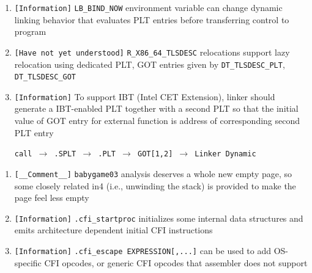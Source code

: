 \documentclass[main.tex]{subfiles}
\begin{document}
\newpage 

\begin{minipage}[t]{0.49\textwidth}
	\setlength{\parskip}{1em}
	\begin{enumerate}
		\item[\texttt{[\_]}] \texttt{[Information]} \texttt{LB\_BIND\_NOW} environment variable can change dynamic linking behavior that evaluates PLT entries before transferring control to program
		\item[\texttt{[\_]}] \texttt{[Have not yet understood]} \texttt{R\_X86\_64\_TLSDESC} relocations support lazy relocation using dedicated PLT, GOT entries given by \texttt{DT\_TLSDESC\_PLT}, \texttt{DT\_TLSDESC\_GOT}
		\item[\texttt{[\_]}] \texttt{[Information]} To support IBT (Intel CET Extension), linker should generate a IBT-enabled PLT together with a second PLT so that the initial value of GOT entry for external function is address of corresponding second PLT entry
		\begin{center}\setlength{\parskip}{0pt}\texttt{call $\rightarrow$ .SPLT $\rightarrow$ .PLT $\rightarrow$ GOT[1,2] $\rightarrow$ Linker Dynamic}\end{center}
	\end{enumerate}
	
	\setlength{\parskip}{0.4em}
	\userline
	
	\setlength{\parskip}{1em}
	\begin{enumerate}
		\item[\texttt{[\_]}] \texttt{[\_\_Comment\_\_]} \texttt{babygame03} analysis deserves a whole new empty page, so some closely related in4 (i.e., unwinding the stack) is provided to make the page feel less empty
		\item[\texttt{[\_]}] \texttt{[Information]} \texttt{.cfi\_startproc}
		initializes some internal data structures and emits architecture dependent initial CFI instructions
		\item[\texttt{[\_]}] \texttt{[Information]} \texttt{.cfi\_escape EXPRESSION[,...]} can be used to add OS-specific CFI opcodes, or generic CFI opcodes that assembler does not support
	\end{enumerate}
	
	\setlength{\parskip}{0.4em}
	\userline
	

\end{minipage}
\end{document}
